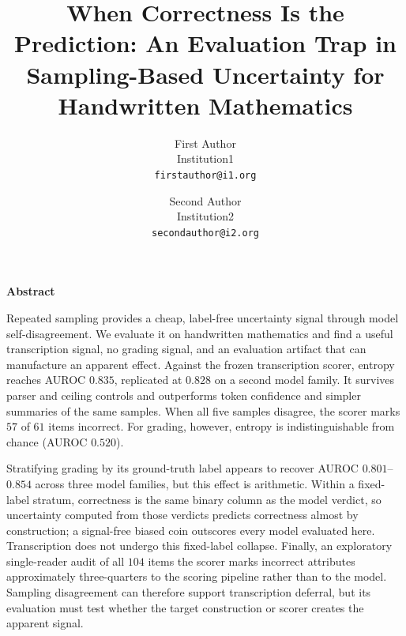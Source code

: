 \documentclass[10pt,twocolumn,letterpaper]{article}
\title{When Correctness Is the Prediction: An Evaluation Trap in
Sampling-Based Uncertainty for Handwritten Mathematics}
\author{First Author\\
Institution1\\
{\tt\small firstauthor@i1.org}
\and
Second Author\\
Institution2\\
{\tt\small secondauthor@i2.org}
}
\renewenvironment{abstract}{%
   \iftoggle{wacvpagenumbers}{}{\thispagestyle{empty}}%
   \centerline{\large\bf Abstract}%
   \vspace*{6pt}\noindent%
   \it\ignorespaces%
}{%
   \vspace*{6pt}%
}
\begin{document}
\maketitle

\begin{abstract}
Repeated sampling provides a cheap, label-free uncertainty signal through
model self-disagreement. We evaluate it on handwritten mathematics and find
a useful transcription signal, no grading signal, and an evaluation artifact
that can manufacture an apparent effect. Against the frozen transcription
scorer, entropy reaches AUROC $0.835$, replicated at $0.828$ on a second model
family. It survives parser and ceiling controls and outperforms token
confidence and simpler summaries of the same samples. When all five samples
disagree, the scorer marks $57$ of $61$ items incorrect. For grading, however,
entropy is indistinguishable from chance (AUROC $0.520$).

Stratifying grading by its ground-truth label appears to recover AUROC
$0.801$--$0.854$ across three model families, but this effect is arithmetic.
Within a fixed-label stratum, correctness is the same binary column as the
model verdict, so uncertainty computed from those verdicts predicts
correctness almost by construction; a signal-free biased coin outscores every
model evaluated here. Transcription does not undergo this fixed-label
collapse. Finally, an exploratory single-reader audit of all $104$ items the
scorer marks incorrect attributes approximately three-quarters to the scoring
pipeline rather than to the model. Sampling disagreement can therefore
support transcription deferral, but its evaluation must test whether the
target construction or scorer creates the apparent signal.
\end{abstract}

\end{document}
